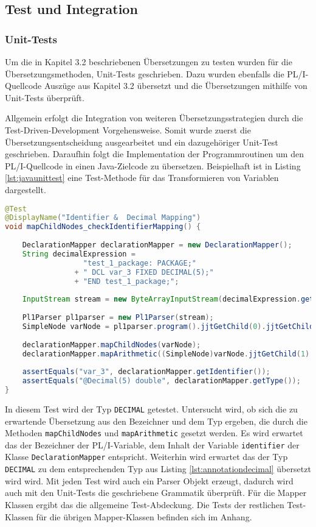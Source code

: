 \pagebreak
\subsection{Test und Integration}
\subsubsection{Unit-Tests}
Um die in Kapitel 3.2 beschriebenen Übersetzungen zu testen wurden für die Übersetzungsmethoden, Unit-Tests geschrieben.
Dazu wurden ebenfalls die PL/I-Quellcode Auszüge aus Kapitel 3.2 übersetzt und die Übersetzungen mithilfe von Unit-Tests überprüft.

Allgemein erfolgt die Integration von weiteren Übersetzungsstrategien durch die Test-Driven-Development Vorgehensweise.
Somit wurde zuerst die Übersetzungsentscheidung ausgearbeitet und ein dazugehöriger Unit-Test geschrieben.
Daraufhin folgt die Implementation der Programmroutinen um den PL/I-Quellcode in einen Java-Zielcode zu übersetzen.
Beispielhaft ist in Listing \ref{lst:javaunittest} eine Test-Methode für das Transformieren von Variablen dargestellt.

\begin{lstlisting}[language=Java, caption=Arithmetic Node Unit-test, label={lst:javaunittest}]
@Test
@DisplayName("Identifier &  Decimal Mapping")
void mapChildNodes_checkIdentifierMapping() {
	
	DeclarationMapper declarationMapper = new DeclarationMapper();
	String decimalExpression = 
				  "test_1_package: PACKAGE;" 
				+ "	DCL var_3 FIXED DECIMAL(5);" 
				+ "END test_1_package;";
	
	InputStream stream = new ByteArrayInputStream(decimalExpression.getBytes(StandardCharsets.UTF_8));
	
	Pl1Parser pl1parser = new Pl1Parser(stream);
	SimpleNode varNode = pl1parser.program().jjtGetChild(0).jjtGetChild(1);
		
	declarationMapper.mapChildNodes(varNode);
	declarationMapper.mapArithmetic((SimpleNode)varNode.jjtGetChild(1).jjtGetChild(0));
		
	assertEquals("var_3", declarationMapper.getIdentifier());
	assertEquals("@Decimal(5) double", declarationMapper.getType());
}
\end{lstlisting} 

In diesem Test wird der Typ \verb+DECIMAL+ getestet. Untersucht wird, ob sich die zu erwartende Übersetzung 
aus den Bezeichner und dem Typ ergeben, die durch die Methoden \verb+mapChildNodes+ und \verb+mapArithmetic+
gesetzt werden.
Es wird erwartet das der Bezeichner der PL/I-Variable, dem Inhalt der Variable \verb+identifier+ der Klasse \verb+DeclarationMapper+ entspricht.
Weiterhin wird erwartet das der Typ \verb+DECIMAL+ zu dem entsprechenden Typ aus Listing \ref{lst:annotationdecimal}
übersetzt wird wird.
Mit jeden Test wird auch ein Parser Objekt erzeugt, dadurch wird auch mit den Unit-Tests die geschriebene Grammatik überprüft.
Für die Mapper Klassen ergibt das die allgemeine Test-Abdeckung.
Die Tests der restlichen Test-Klassen für die übrigen Mapper-Klassen befinden sich im Anhang.

